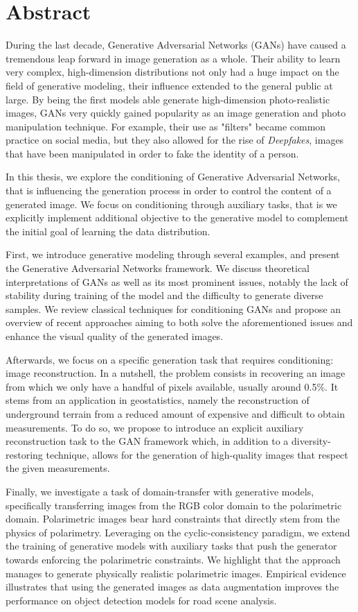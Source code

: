 \chapter*{Abstract}
\label{chap:abstract}

During the last decade, Generative Adversarial Networks (\ac{GANs}) have caused a tremendous leap forward in image generation as a whole. Their ability to learn very complex, high-dimension distributions not only had a huge impact on the field of generative modeling, their influence extended to the general public at large. By being the first models able generate high-dimension photo-realistic images, \ac{GANs} very quickly gained popularity as an image generation and photo manipulation technique. For example, their use as "filters" became common practice on social media, but they also allowed for the rise of \textit{Deepfakes}, images that have been manipulated in order to fake the identity of a person. 

In this thesis, we explore the conditioning of Generative Adversarial Networks, that is influencing the generation process in order to control the content of a generated image. We focus on conditioning through auxiliary tasks, that is we  explicitly implement additional objective to the generative model to complement the initial goal of learning the data distribution.

First, we introduce generative modeling through several examples, and present the Generative Adversarial Networks framework. We discuss theoretical interpretations of \ac{GANs} as well as its most prominent issues, notably the lack of stability during training of the model and the difficulty to generate diverse samples. We review classical techniques for conditioning GANs and propose an overview of recent approaches aiming to both solve the aforementioned issues and enhance the visual quality of the generated images.

Afterwards, we focus on a specific generation task that requires conditioning: image reconstruction. In a nutshell, the problem consists in recovering an image from which we only have a handful of pixels available, usually around 0.5\%. It stems from an application in geostatistics, namely the reconstruction of underground terrain from a reduced amount of expensive and difficult to obtain measurements. To do so, we propose to introduce an explicit auxiliary reconstruction task to the GAN framework which, in addition to a diversity-restoring technique, allows for the generation of high-quality images that respect the given measurements.

Finally, we investigate a task of domain-transfer with generative models, specifically transferring images from the \ac{RGB} color domain to the polarimetric domain. Polarimetric images bear hard constraints that directly stem from the physics of polarimetry. Leveraging on the cyclic-consistency paradigm, we extend the training of generative models with auxiliary tasks that push the generator towards enforcing the polarimetric constraints. We highlight that the approach manages to generate physically realistic polarimetric images. Empirical evidence illustrates that using the generated images as  data augmentation improves the performance on object detection models for road scene analysis.